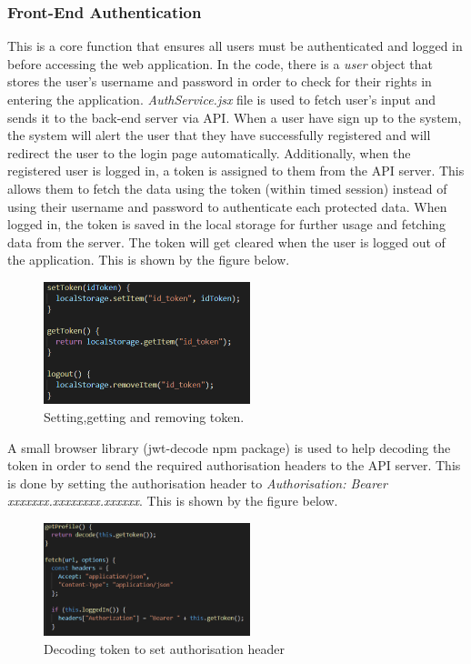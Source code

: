 \documentclass{article}
\begin{document}
\subsubsection {Front-End Authentication}
This is a core function that ensures all users must be authenticated and logged in before accessing the web application.
In the code, there is a \emph{user} object that stores the user's username and password in order to check for their rights in entering the application. \emph{AuthService.jsx} file is used to fetch user's input and sends it to the back-end server via API. When a user have sign up to the system, the system will alert the user that they have successfully registered and will redirect the user to the login page automatically. Additionally, when the registered user is logged in, a token is assigned to them from the API server. This allows them to fetch the data using the token (within timed session) instead of using their username and password to authenticate each protected data.
When logged in, the token is saved in the local storage for further usage and fetching data from the server. The token will get cleared when the user is logged out of the application. This is shown by the figure below.

\begin{figure}[H]
\begin{center}
\includegraphics[width=6cm]{tokenAuth.PNG}
\end{center}
\caption{Setting,getting and removing token.}\label{ex4}
\end{figure}

A small browser library (jwt-decode npm package) \cite{c15} is used to help decoding the token in order to send the required authorisation headers to the API server. This is done by setting the authorisation header to \emph{Authorisation: Bearer xxxxxxx.xxxxxxxx.xxxxxx}. This is shown by the figure below.

\begin{figure}[H]
\begin{center}
\includegraphics[width=6cm]{decodeToken.PNG}
\end{center}
\caption{Decoding token to set authorisation header}\label{ex4}
\end{figure}
\end{document}
